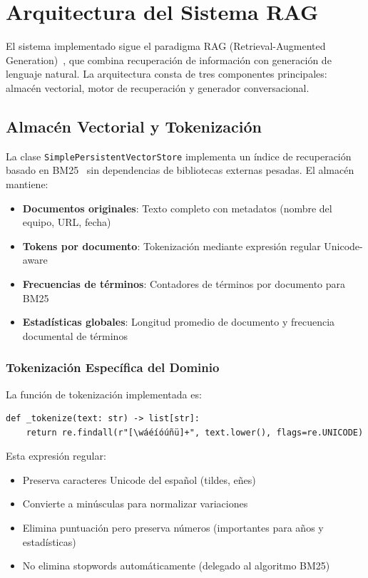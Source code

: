 \section{Arquitectura del Sistema RAG}%
\label{sec:arquitectura}

El sistema implementado sigue el paradigma RAG (Retrieval-Augmented Generation)~\cite{lewis2020retrieval}, que combina recuperación de información con generación de lenguaje natural. La arquitectura consta de tres componentes principales: almacén vectorial, motor de recuperación y generador conversacional.

\subsection{Almacén Vectorial y Tokenización}

La clase \texttt{SimplePersistentVectorStore} implementa un índice de recuperación basado en BM25~\cite{robertson2009probabilistic} sin dependencias de bibliotecas externas pesadas. El almacén mantiene:

\begin{itemize}
    \item \textbf{Documentos originales}: Texto completo con metadatos (nombre del equipo, URL, fecha)
    \item \textbf{Tokens por documento}: Tokenización mediante expresión regular Unicode-aware
    \item \textbf{Frecuencias de términos}: Contadores de términos por documento para BM25
    \item \textbf{Estadísticas globales}: Longitud promedio de documento y frecuencia documental de términos
\end{itemize}

\subsubsection{Tokenización Específica del Dominio}

La función de tokenización implementada es:

\begin{verbatim}
def _tokenize(text: str) -> list[str]:
    return re.findall(r"[\wáéíóúñü]+", text.lower(), flags=re.UNICODE)
\end{verbatim}

Esta expresión regular:
\begin{itemize}
    \item Preserva caracteres Unicode del español (tildes, eñes)
    \item Convierte a minúsculas para normalizar variaciones
    \item Elimina puntuación pero preserva números (importantes para años y estadísticas)
    \item No elimina stopwords automáticamente (delegado al algoritmo BM25)
\end{itemize}

